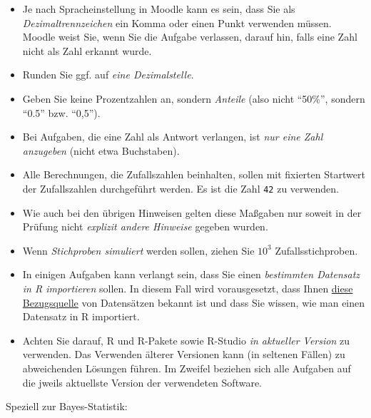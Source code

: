 \documentclass[
  a4paper,
  DIV=11]{scrreprt}
\providecommand{\tightlist}{%
  \setlength{\itemsep}{0pt}\setlength{\parskip}{0pt}}\usepackage{longtable,booktabs,array}
\theoremstyle{definition}
\theoremstyle{remark}
\begin{document}
\begin{itemize}
\tightlist
\item
  Je nach Spracheinstellung in Moodle kann es sein, dass Sie als
  \emph{Dezimaltrennzeichen} ein Komma oder einen Punkt verwenden
  müssen. Moodle weist Sie, wenn Sie die Aufgabe verlassen, darauf hin,
  falls eine Zahl nicht als Zahl erkannt wurde.
\item
  Runden Sie ggf. auf \emph{eine Dezimalstelle}.
\item
  Geben Sie keine Prozentzahlen an, sondern \emph{Anteile} (also nicht
  ``50\%'', sondern ``0.5'' bzw. ``0,5'').
\item
  Bei Aufgaben, die eine Zahl als Antwort verlangen, ist \emph{nur eine
  Zahl anzugeben} (nicht etwa Buchstaben).
\item
  Alle Berechnungen, die Zufallszahlen beinhalten, sollen mit fixierten
  Startwert der Zufallszahlen durchgeführt werden. Es ist die Zahl
  \texttt{42} zu verwenden.
\item
  Wie auch bei den übrigen Hinweisen gelten diese Maßgaben nur soweit in
  der Prüfung nicht \emph{explizit andere Hinweise} gegeben wurden.
\item
  Wenn \emph{Stichproben simuliert} werden sollen, ziehen Sie \(10^3\)
  Zufallsstichproben.
\item
  In einigen Aufgaben kann verlangt sein, dass Sie einen
  \emph{bestimmten Datensatz in R importieren} sollen. In diesem Fall
  wird vorausgesetzt, dass Ihnen
  \href{https://vincentarelbundock.github.io/Rdatasets/articles/data.html}{diese
  Bezugsquelle} von Datensätzen bekannt ist und dass Sie wissen, wie man
  einen Datensatz in R importiert.
\item
  Achten Sie darauf, R und R-Pakete sowie R-Studio \emph{in aktueller
  Version} zu verwenden. Das Verwenden älterer Versionen kann (in
  seltenen Fällen) zu abweichenden Lösungen führen. Im Zweifel beziehen
  sich alle Aufgaben auf die jweils aktuellste Version der verwendeten
  Software.
\end{itemize}

Speziell zur Bayes-Statistik:
\end{document}
